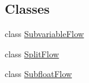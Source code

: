 \subsection*{Classes}
\begin{DoxyCompactItemize}
\item 
class \mbox{\hyperlink{class_subvariable_flow}{Subvariable\+Flow}}
\item 
class \mbox{\hyperlink{class_split_flow}{Split\+Flow}}
\item 
class \mbox{\hyperlink{class_subfloat_flow}{Subfloat\+Flow}}
\end{DoxyCompactItemize}

